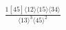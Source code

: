 \documentclass[varwidth, border=5pt]{standalone}
\begin{document}
\begin{my}
$\begin{gathered}
\scriptscriptstyle\frac{1[45]⟨12⟩⟨15⟩⟨34⟩}{⟨13⟩^3⟨45⟩^2}
\end{gathered}$
\end{my}
\end{document}
